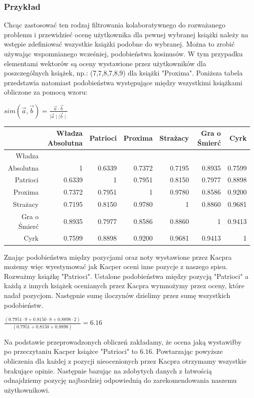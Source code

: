 \documentclass[12pt,a4paper]{report}
\begin{document}
{\subsubsection{Przykład}
Chcąc zastosować ten rodzaj filtrowania kolaboratywnego do rozważanego problemu i przewidzieć ocenę użytkownika dla pewnej wybranej książki należy na wstępie zdefiniować wszystkie książki podobne do wybranej. Można to zrobić używając wspomnianego wcześniej, podobieństwa kosinusów. W tym przypadku elementami wektorów są oceny wystawione przez użytkowników dla poszczególnych książek, np.: (7,7,8,7,8,9) dla książki "Proxima". Poniższa tabela przedstawia natomiast podobieństwa występujące między wszystkimi książkami obliczone za pomocą wzoru:
\begin{center}
$ sim (\vec{a},\vec{b}) = \frac{\vec{a} \cdot \vec{b}}{\mid \vec{a} \mid \mid \vec{b} \mid }$
\end{center}
\begin{center}
\footnotesize{
\begin{tabular}{|r|r|r|r|r|r|r|} \hline
 & Władza Absolutna & Patrioci & Proxima & Strażacy & Gra o Śmierć & Cyrk \\
\hline
Władza & & & & & & \\
Absolutna & 1 & 0.6339 & 0.7372 & 0.7195 & 0.8935 & 0.7599 \\
\hline
Patrioci & 0.6339 & 1 & 0.7951 & 0.8150 & 0.7977 & 0.8898 \\
\hline
Proxima & 0.7372 & 0.7951 & 1 & 0.9780 & 0.8586 & 0.9200 \\
\hline
Strażacy & 0.7195 & 0.8150 & 0.9780 & 1 & 0.8860 & 0.9681 \\
\hline
Gra o Śmierć & 0.8935 & 0.7977 & 0.8586 & 0.8860 & 1 & 0.9413 \\
\hline
Cyrk & 0.7599 & 0.8898 & 0.9200 & 0.9681 & 0.9413 & 1 \\
\hline
\end{tabular}
}
\end{center}
Znając podobieństwa między pozycjami oraz noty wystawione przez Kacpra możemy więc wyestymować jak Kacper oceni inne pozycje z naszego spisu. 
\\Rozważmy książkę "Patrioci". Ustalone podobieństwa między pozycją "Patrioci" a każdą z innych książek ocenianych przez Kacpra wymnożymy przez oceny, które nadał pozycjom. Następnie sumę iloczynów dzielimy przez sumę wszystkich podobieństw.
\begin{center}
$\frac{(0.7951 \cdot 9 + 0.8150 \cdot 8 + 0.8898 \cdot 2)}{(0.7951 + 0.8150 + 0.8898)} = 6.16 $
\end{center}
Na podstawie przeprowadzonych obliczeń zakładamy, że ocena jaką wystawiłby po przeczytaniu Kacper książce "Patrioci" to $6.16$.
Powtarzając powyższe obliczenia dla każdej z pozycji nieocenionych przez Kacpra otrzymamy wszystkie brakujące opinie. Następnie bazując na zdobytych danych z łatwością odnajdziemy pozycję najbardziej odpowiednią do zarekomendowania naszemu użytkownikowi.
}
\end{document}

